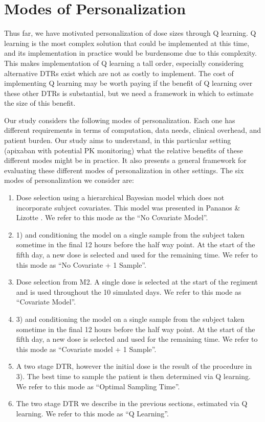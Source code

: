 \section{Modes of Personalization}

Thus far, we have motivated personalization of dose sizes through Q learning.  Q learning is the most complex solution that could be implemented at this time, and its implementation in practice would be burdensome due to this complexity. This makes implementation of Q learning a tall order, especially considering alternative DTRs exist which are not as costly to implement. The cost of implementing Q learning may be worth paying if the benefit of Q learning over these other DTRs is substantial, but we need a framework in which to estimate the size of this benefit. 


Our study considers the following modes of personalization. Each one has different requirements in terms of computation, data needs, clinical overhead, and patient burden. Our study aims to understand, in this particular setting (apixaban with potential PK monitoring) what the relative benefits of these different modes might be in practice. It also presents a general framework for evaluating these different modes of personalization in other settings.  The six modes of personalization we consider are:

\begin{enumerate}[1)]
\item Dose selection using a hierarchical Bayesian model which does not incorporate subject covariates.  This model was presented in Pananos \& Lizotte \cite{pananos2020comparisons}.  We refer to this mode as the “No Covariate Model”.
\item 1) and conditioning the model on a single sample from the subject taken sometime in the final 12 hours before the half way point.  At the start of the fifth day, a new dose is selected and used for the remaining time.  We refer to this mode as “No Covariate + 1 Sample”.
\item Dose selection from M2.  A single dose is selected at the start of the regiment and is used throughout the 10 simulated days. We refer to this mode as “Covariate Model”.
\item 3) and conditioning the model on a single sample from the subject taken sometime in the final 12 hours before the half way point.  At the start of the fifth day, a new dose is selected and used for the remaining time. We refer to this mode as “Covariate model + 1 Sample”.
\item A two stage DTR, however the initial dose is the result of the procedure in 3).  The best time to sample the patient is then determined via Q learning. We refer to this mode as “Optimal Sampling Time”.
\item The two stage DTR we describe in the previous sections, estimated via Q learning.  We refer to this mode as “Q Learning”.

\end{enumerate}


